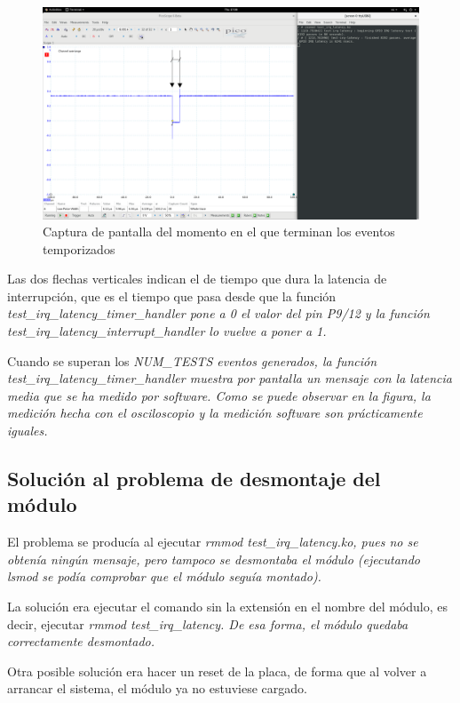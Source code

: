 \documentclass[../main.tex]{subfiles}
\begin{document}
\begin{figure}[h]
\centering
\includegraphics[width=1\textwidth]{imagenes/Apartado1-CapturaOsciloscopio.png}
\caption{Captura de pantalla del momento en el que terminan los eventos temporizados}
\end{figure}

Las dos flechas verticales indican el de tiempo que dura la latencia de interrupción, que es el tiempo que pasa desde que la función \it{test\_irq\_latency\_timer\_handler} pone a 0 el valor del pin P9/12 y la función \it{test\_irq\_latency\_interrupt\_handler} lo vuelve a poner a 1.

Cuando se superan los \it{NUM\_TESTS} eventos generados, la función \it{test\_irq\_latency\_timer\_handler} muestra por pantalla un mensaje con la latencia media que se ha medido por software. Como se puede observar en la figura, la medición hecha con el osciloscopio y la medición software son prácticamente iguales.

\subsection{Solución al problema de desmontaje del módulo}

El problema se producía al ejecutar \it{rmmod test\_irq\_latency.ko}, pues no se obtenía ningún mensaje, pero tampoco se desmontaba el módulo (ejecutando \it{lsmod} se podía comprobar que el módulo seguía montado).

La solución era ejecutar el comando sin la extensión en el nombre del módulo, es decir, ejecutar \it{rmmod test\_irq\_latency}. De esa forma, el módulo quedaba correctamente desmontado. 

Otra posible solución era hacer un reset de la placa, de forma que al volver a arrancar el sistema, el módulo ya no estuviese cargado.
\end{document}
